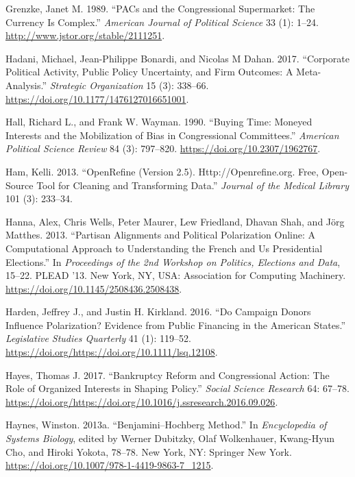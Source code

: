 \documentclass[12pt,]{article}
\begin{document}
\leavevmode\hypertarget{ref-grenzke1989}{}%
Grenzke, Janet M. 1989. ``PACs and the Congressional Supermarket: The
Currency Is Complex.'' \emph{American Journal of Political Science} 33
(1): 1--24. \url{http://www.jstor.org/stable/2111251}.

\leavevmode\hypertarget{ref-hadani2017}{}%
Hadani, Michael, Jean-Philippe Bonardi, and Nicolas M Dahan. 2017.
``Corporate Political Activity, Public Policy Uncertainty, and Firm
Outcomes: A Meta-Analysis.'' \emph{Strategic Organization} 15 (3):
338--66. \url{https://doi.org/10.1177/1476127016651001}.

\leavevmode\hypertarget{ref-hall1990}{}%
Hall, Richard L., and Frank W. Wayman. 1990. ``Buying Time: Moneyed
Interests and the Mobilization of Bias in Congressional Committees.''
\emph{American Political Science Review} 84 (3): 797--820.
\url{https://doi.org/10.2307/1962767}.

\leavevmode\hypertarget{ref-openrefine}{}%
Ham, Kelli. 2013. ``OpenRefine (Version 2.5). Http://Openrefine.org.
Free, Open-Source Tool for Cleaning and Transforming Data.''
\emph{Journal of the Medical Library} 101 (3): 233--34.

\leavevmode\hypertarget{ref-hanna2013}{}%
Hanna, Alex, Chris Wells, Peter Maurer, Lew Friedland, Dhavan Shah, and
Jörg Matthes. 2013. ``Partisan Alignments and Political Polarization
Online: A Computational Approach to Understanding the French and Us
Presidential Elections.'' In \emph{Proceedings of the 2nd Workshop on
Politics, Elections and Data}, 15--22. PLEAD '13. New York, NY, USA:
Association for Computing Machinery.
\url{https://doi.org/10.1145/2508436.2508438}.

\leavevmode\hypertarget{ref-harden2016}{}%
Harden, Jeffrey J., and Justin H. Kirkland. 2016. ``Do Campaign Donors
Influence Polarization? Evidence from Public Financing in the American
States.'' \emph{Legislative Studies Quarterly} 41 (1): 119--52.
\url{https://doi.org/https://doi.org/10.1111/lsq.12108}.

\leavevmode\hypertarget{ref-hayes2017}{}%
Hayes, Thomas J. 2017. ``Bankruptcy Reform and Congressional Action: The
Role of Organized Interests in Shaping Policy.'' \emph{Social Science
Research} 64: 67--78.
\url{https://doi.org/https://doi.org/10.1016/j.ssresearch.2016.09.026}.

\leavevmode\hypertarget{ref-bh}{}%
Haynes, Winston. 2013a. ``Benjamini--Hochberg Method.'' In
\emph{Encyclopedia of Systems Biology}, edited by Werner Dubitzky, Olaf
Wolkenhauer, Kwang-Hyun Cho, and Hiroki Yokota, 78--78. New York, NY:
Springer New York. \url{https://doi.org/10.1007/978-1-4419-9863-7_1215}.
\end{document}
